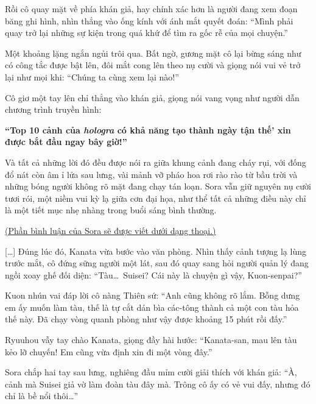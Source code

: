 \documentclass[../main.tex]{subfiles}
\begin{document}
Rồi cô quay mặt về phía khán giả, hay chính xác hơn là người đang xem đoạn băng ghi hình, nhìn thẳng vào ống kính với ánh mắt quyết đoán: ``Mình phải quay trở lại những sự kiện trong quá khứ để tìm ra gốc rễ của mọi chuyện.''

Một khoảng lặng ngắn ngủi trôi qua. Bất ngờ, gương mặt cô lại bừng sáng như có công tắc được bật lên, đôi mắt cong lên theo nụ cười và giọng nói vui vẻ trở lại như mọi khi: ``Chúng ta cùng xem lại nào!''

Cô giơ một tay lên chỉ thẳng vào khán giả, giọng nói vang vọng như người dẫn chương trình truyền hình:

\begin{center}
  \textbf{``Top 10 cảnh của \textit{hologra} có khả năng tạo thành ngày tận thế' xin được bắt đầu ngay bây giờ!''}
\end{center}

Và tất cả những lời đó đều được nói ra giữa khung cảnh đang cháy rụi, với đống đổ nát còn âm ỉ lửa sau lưng, vài mảnh vỡ pháo hoa rơi rào rào từ bầu trời và những bóng người không rõ mặt đang chạy tán loạn. Sora vẫn giữ nguyên nụ cười tươi rói, một niềm vui kỳ lạ giữa cơn đại họa, như thể tất cả những điều này chỉ là một tiết mục nhẹ nhàng trong buổi sáng bình thường.

\il

\begin{center}
  \uline{(Phần bình luận của Sora sẽ được viết dưới dạng thoại.)}
\end{center}



[\dots] Đúng lúc đó, Kanata vừa bước vào văn phòng. Nhìn thấy cảnh tượng lạ lùng trước mắt, cô đứng sững người một lát, sau đó quay sang hỏi người quản lý đang ngồi xoay ghế đối diện: ``Tàu\dots\ Suisei? Cái này là chuyện gì vậy, Kuon-senpai?''

Kuon nhún vai đáp lời cô nàng Thiên sứ: ``Anh cũng không rõ lắm. Bỗng dưng em ấy muốn làm tàu, thế là tự cắt dán bìa các-tông thành cả một con tàu hỏa thế này. Đã chạy vòng quanh phòng như vậy được khoảng 15 phút rồi đấy.''

Ryuuhou vẫy tay chào Kanata, giọng đầy hài hước: ``Kanata-san, mau lên tàu kẻo lỡ chuyến! Em cũng vừa định xin đi một vòng đây.''

Sora chắp hai tay sau lưng, nghiêng đầu mỉm cười giải thích với khán giả: ``À, cảnh mà Suisei giả vờ làm đoàn tàu đây mà. Trông cô ấy có vẻ vui đấy, nhưng đó chỉ là bề nổi thôi\dots''
\end{document}
